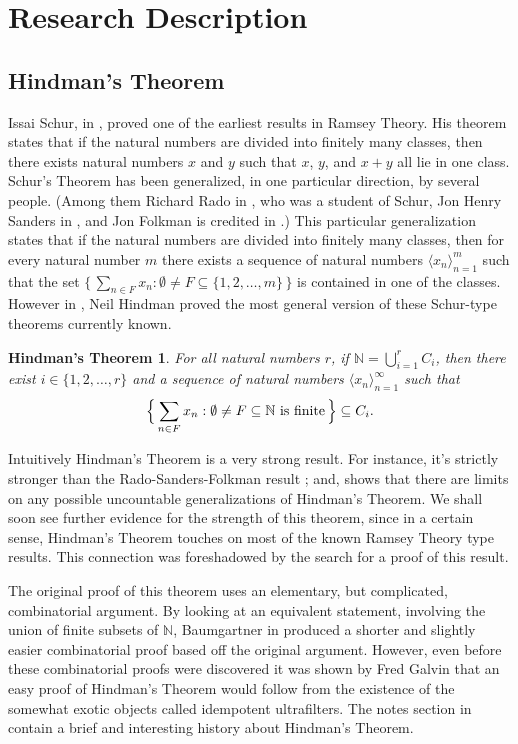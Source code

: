 \documentclass[12pt]{article}
\theoremstyle{plain}
\newtheorem{fst}[thm]{Hindman's Theorem}
\theoremstyle{definition}
\newcommand{\bbN}{\mathbb{N}}
\newcommand{\la}{\langle}
\newcommand{\ra}{\rangle}
\begin{document}
\section{Research Description}
\subsection{Hindman's Theorem}
Issai Schur, in \cite{Schur:1916fk}, proved one of the earliest
results in Ramsey Theory. 
His theorem states that if the natural numbers are divided into
finitely many classes, then there exists natural numbers $x$ and $y$
such that $x$, $y$, and $x+y$ all lie in one class.
Schur's Theorem has been generalized, in one particular direction, by
several people.
(Among them Richard Rado in \cite{Rado:1933kx}, who was a student of
Schur, Jon Henry Sanders in \cite{Sanders:1968uq}, and Jon Folkman is
credited in \cite{Graham:1971vn}.)
This particular generalization states that if the natural numbers are
divided into finitely many classes, then for every natural number $m$
there exists a sequence of natural numbers $\la x_n \ra_{n=1}^m$ such
that the set $\bigl\{\, \sum_{n \in F} x_n : \emptyset \ne F \subseteq \{1,
2, \ldots, m\} \,\bigr\}$ is contained in one of the classes.
However in \cite{Hindman:1974ys}, Neil Hindman proved the most general
version of these Schur-type theorems currently known. 

  \begin{fst}
    For all natural numbers $r$, if \/ $\bbN = \bigcup_{i=1}^r C_i$, then
    there exist $i \in \{1, 2, \ldots, r\}$ and a sequence of natural
    numbers $\la x_n \ra_{n=1}^\infty$ such that
      \[
        \Bigl\{\, \sum_{n\in F} x_n : \emptyset \ne F \subseteq \bbN
        \hbox{ is finite} \,\Bigr\} \subseteq C_i.
      \]
  \end{fst}

Intuitively Hindman's Theorem is a very strong result.
For instance, it's strictly stronger than the Rado-Sanders-Folkman
result \cite[Theorems 16.28 and 16.29]{Hindman:1998fk}; and,
\cite{Milliken:1978fk} shows that there are limits on any possible
uncountable generalizations of Hindman's Theorem. 
We shall soon see further evidence for the strength of this theorem,
since in a certain sense, Hindman's Theorem touches on most of the
known Ramsey Theory type results. 
This connection was foreshadowed by the search for a proof of this
result. 

The original proof of this theorem uses an elementary, but
complicated, combinatorial argument. 
By looking at an equivalent statement, involving the union of finite
subsets of $\bbN$, Baumgartner in \cite{Baumgartner:1974uq} produced a
shorter and slightly easier combinatorial proof based off the original
argument.
However, even before these combinatorial proofs were discovered
it was shown by Fred Galvin that an easy proof of Hindman's Theorem
would follow from the existence of the somewhat exotic objects called
idempotent ultrafilters. 
The notes section in \cite[Chapter 5]{Hindman:1998fk} contain a brief
and interesting history about Hindman's Theorem. 
\end{document}
